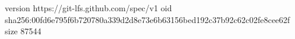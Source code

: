 version https://git-lfs.github.com/spec/v1
oid sha256:00fd6e795f6b720780a339d2d8e73e6b63156bed192c37b92c62c02fe8cee62f
size 87544
